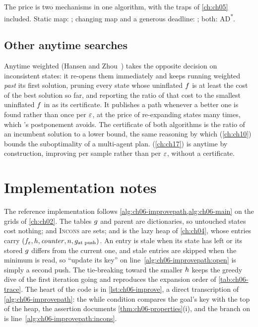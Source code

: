 The price is two mechanisms in one algorithm, with the traps of \cref{ch:ch05}
included. Static map: \arastar; changing map and a generous deadline:
\dstarlite; both: AD\textsuperscript{*}.

\subsection{Other anytime searches}

Anytime weighted \astar (Hansen and Zhou~\cite{hansen2007anytime}) takes the
opposite decision on inconsistent states: it re-opens them immediately and
keeps running weighted \astar \emph{past} its first solution, pruning every
state whose uninflated $f$ is at least the cost of the best solution so
far, and reporting the ratio of that cost to the smallest uninflated $f$
in \Open as its certificate. It publishes a path whenever a better one is
found rather than once per $\varepsilon$, at the price of re-expanding states many
times, which \arastar's postponement avoids. The certificate of both algorithms is the
ratio of an incumbent solution to a lower bound, the same reasoning by which
\ecbs (\cref{ch:ch10}) bounds the suboptimality of a multi-agent plan.
\rrtstar (\cref{ch:ch17}) is anytime by construction, improving per sample
rather than per $\varepsilon$, without a certificate.

\section{Implementation notes}
\label{sec:ch06-implementation}

The reference implementation  follows
\cref{alg:ch06-improvepath,alg:ch06-main} on the grids of \cref{ch:ch02}. The
tables $g$ and parent are dictionaries, so untouched states cost
nothing; \Closed and \textsc{Incons} are sets; and \Open is the lazy heap of
\cref{ch:ch04}, whose entries carry $(f_\varepsilon, h, \mathit{counter},
n, g_{\text{at push}})$. An entry is stale when its state has left
\Open or its stored $g$ differs from the current one, and stale entries
are skipped when the minimum is read, so ``update its key'' on
line~\ref{alg:ch06-improvepath:open} is simply a second push. The
tie-breaking toward the smaller $h$ keeps the greedy dive of the first
iteration going and reproduces the expansion order of \cref{tab:ch06-trace}.
The heart of the code is  in \cref{lst:ch06-improve},
a direct transcription of \cref{alg:ch06-improvepath}: the while condition
compares the goal's key with the top of the heap, the assertion documents
\cref{thm:ch06-properties}(i), and the branch on  is
line~\ref{alg:ch06-improvepath:incons}.

